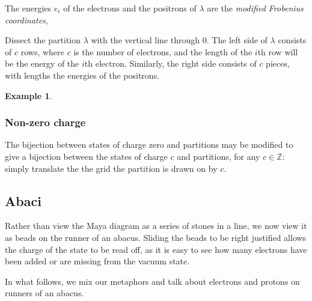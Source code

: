 \documentclass{amsart}[12pt]
\theoremstyle{definition}
\newtheorem{example}[dummy]{Example}
\newcommand{\Z}{\mathbb{Z}}
\begin{document}
The energies $e_i$ of the electrons and the positrons of $\lambda$ are
the \emph{modified Frobenius coordinates},

Dissect the partition $\lambda$ with the vertical line through
$0$.  The left side of $\lambda$ consists of $c$ rows, where $c$ is the number
of electrons, and the length of the $i$th row will be the energy of
the $i$th electron.  Similarly, the right side consists of $c$
pieces, with lengths the energies of the positrons.

\begin{example}


\end{example}

\subsubsection{Non-zero charge}

The bijection between states of charge zero and partitions may be
modified to give a bijection between the states of charge $c$ and
partitions, for any $c\in\Z$: simply translate the the grid the
partition is drawn on by $c$.



\subsection{Abaci}

Rather than view the Maya diagram as a series of stones in a line, we
now view it as beads on the runner of an abacus.  Sliding the beads
to be right justified allows the charge of the state to be read off,
as it is easy to see how many electrons have been added or are missing
from the vacuum state.

In what follows, we mix our metaphors and talk about electrons and protons on runners of an abacus.
\end{document}
